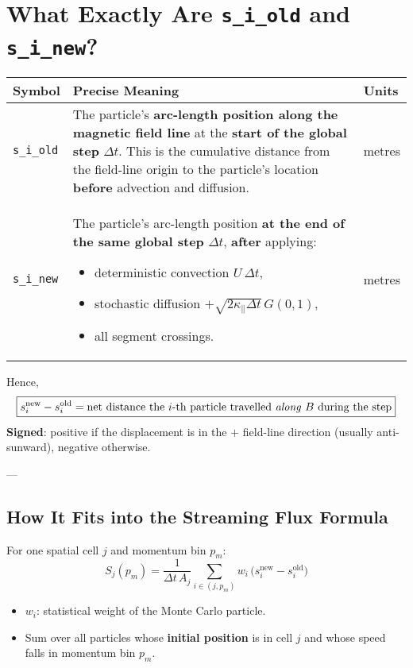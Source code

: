 \section*{What Exactly Are \texttt{s\_i\_old} and \texttt{s\_i\_new}?}

\begin{table}[h!]
\centering
\renewcommand{\arraystretch}{1.3}
\begin{tabular}{p{3cm} p{10cm} p{2cm}}
\toprule
\textbf{Symbol} & \textbf{Precise Meaning} & \textbf{Units} \\
\midrule
\texttt{s\_i\_old} & The particle’s \textbf{arc-length position along the magnetic field line} at the \textbf{start of the global step} $\Delta t$. This is the cumulative distance from the field-line origin to the particle’s location \textbf{before} advection and diffusion. & metres \\
\texttt{s\_i\_new} & The particle’s arc-length position \textbf{at the end of the same global step} $\Delta t$, \textbf{after} applying:
\begin{itemize}
  \item deterministic convection $U\,\Delta t$,
  \item stochastic diffusion $+\sqrt{2\kappa_\parallel \Delta t}\,G(0,1)$,
  \item all segment crossings.
\end{itemize}
& metres \\
\bottomrule
\end{tabular}
\end{table}

\noindent Hence,
\[
\boxed{
s_i^{\text{new}} - s_i^{\text{old}} = \text{net distance the $i$-th particle travelled \emph{along} $B$ during the step}
}
\]
\noindent \textbf{Signed}: positive if the displacement is in the $+$ field-line direction (usually anti-sunward), negative otherwise.

---

\subsection*{How It Fits into the Streaming Flux Formula}

For one spatial cell $j$ and momentum bin $p_m$:
\[
S_j(p_m) =
\frac{1}{\Delta t\, A_j} \sum_{i \in (j, p_m)}
w_i\, \bigl(s_i^{\text{new}} - s_i^{\text{old}}\bigr)
\]

\begin{itemize}
    \item $w_i$: statistical weight of the Monte Carlo particle.
    \item Sum over all particles whose \textbf{initial position} is in cell $j$ and whose speed falls in momentum bin $p_m$.
\end{itemize}

